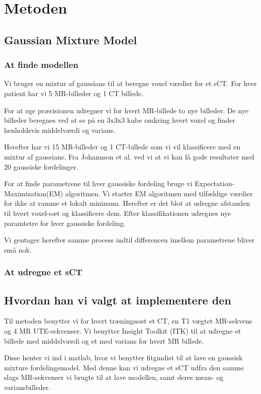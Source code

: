 \section{Metoden}
\subsection{Gaussian Mixture Model}

\subsubsection{At finde modellen}
Vi bruger en mixtur af gaussians til at beregne voxel værdier
for et sCT. For hver patient har vi 5 MR-billeder og 1 CT billede.

For at øge præcisionen udregner vi for hvert MR-billede
to nye billeder. De nye billeder beregnes ved at se på en 3x3x3
kube omkring hvert voxel og finder henholdsvis middelværdi og varians.

Herefter har vi 15 MR-billeder og 1 CT-billede som vi vil klassificere
med en mixtur af gaussians. Fra Johannson et al. ved vi at vi kan få
gode resultater med 20 gaussiske fordelinger.

For at finde parametrene til hver gaussiske fordeling bruge vi 
Expectation-Maximization(EM) algoritmen. Vi starter EM algoritmen med
tilfældige værdier for ikke at ramme et lokalt minimum. Herefter er
det blot at udregne afstanden til hvert voxel-sæt og klassificere dem.
Efter klassifikationen udregnes nye paramtetre for hver gaussiske
fordeling.

Vi gentager herefter samme process indtil differencen imellem parametrene
bliver små nok.


\subsubsection{At udregne et sCT}


\subsection{Hvordan han vi valgt at implementere den}


Til metoden benytter vi for hvert træningssæt et CT, en T1 vægtet MR-sekvens
og 4 MR UTE-sekvenser. Vi benytter Insight Toolkit (ITK) til at udregne et
billede med middelværdi og et med varians for hvert MR billede.

Disse henter vi ind i matlab, hvor vi benytter fitgmdist til at lave en
gaussisk mixture fordelingsmodel. Med denne kan vi udregne et sCT udfra den
samme slags MR-sekvenser vi brugte til at lave modellen, samt deres
mean- og variansbilleder.
